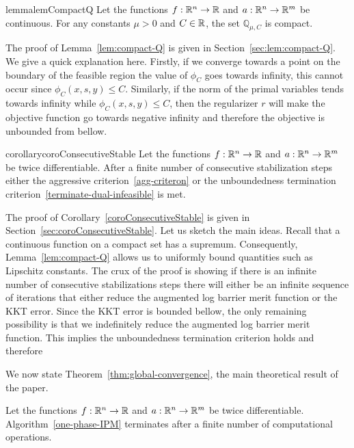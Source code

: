 \documentclass{article}
\begin{document}
\begin{restatable}{lemma}{lemCompactQ}\label{lem:compact-Q}
Let the functions $f : \mathbb{R}^{n} \rightarrow \mathbb{R}$ and $a : \mathbb{R}^{n} \rightarrow \mathbb{R}^{m}$ be continuous. For any constants $\mu > 0$ and $C \in \mathbb{R}$, the set $\mathbb{Q}_{\mu, C}$ is compact.
\end{restatable}

The proof of Lemma~\ref{lem:compact-Q} is given in Section~\ref{sec:lem:compact-Q}. We give a quick explanation here. Firstly, if we converge towards a point on the boundary of the feasible region the value of $\phi_{C}$ goes towards infinity, this cannot occur since $\phi_{C}(x, s, y) \le C$. Similarly, if the norm of the primal variables tends towards infinity while $\phi_{C}(x, s, y) \le C$, then the regularizer $r$ will make the objective function go towards negative infinity and therefore the objective is unbounded from bellow.

\begin{restatable}{corollary}{coroConsecutiveStable}\label{coroConsecutiveStable}
Let the functions $f : \mathbb{R}^{n} \rightarrow \mathbb{R}$ and $a : \mathbb{R}^{n} \rightarrow \mathbb{R}^{m}$ be twice differentiable.
After a finite number of consecutive stabilization steps either the aggressive criterion~\eqref{agg-criteron} or the unboundedness termination criterion~\eqref{terminate-dual-infeasible}  is met.
\end{restatable}

The proof of Corollary~\ref{coroConsecutiveStable} is given in Section~\ref{sec:coroConsecutiveStable}. Let us sketch the main ideas. Recall that a continuous function on a compact set has a supremum. Consequently, Lemma~\ref{lem:compact-Q} allows us to uniformly bound quantities such as Lipschitz constants. The crux of the proof is showing if there is an infinite number of consecutive stabilizations steps there will either be an infinite sequence of iterations that either reduce the augmented log barrier merit function or the KKT error. Since the KKT error is bounded bellow, the only remaining possibility is that we indefinitely reduce the augmented log barrier merit function. This implies the unboundedness termination criterion holds and therefore 

We now state Theorem~\ref{thm:global-convergence}, the main theoretical result of the paper.

\begin{theorem}\label{thm:global-convergence}
Let the functions $f : \mathbb{R}^{n} \rightarrow \mathbb{R}$ and $a : \mathbb{R}^{n} \rightarrow \mathbb{R}^{m}$ be twice differentiable.
Algorithm~\ref{one-phase-IPM} terminates after a finite number of computational operations.
\end{theorem}
\end{document}
